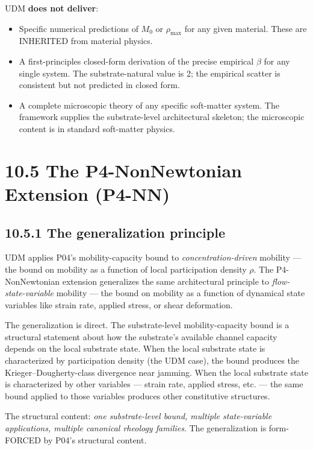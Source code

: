 \documentclass[11pt]{book}
\begin{document}
UDM \textbf{does not deliver}:
\begin{itemize}
\item Specific numerical predictions of $M_0$ or $\rho_\mathrm{max}$ for any given material. These are INHERITED from material physics.
\item A first-principles closed-form derivation of the precise empirical $\beta$ for any single system. The substrate-natural value is 2; the empirical scatter is consistent but not predicted in closed form.
\item A complete microscopic theory of any specific soft-matter system. The framework supplies the substrate-level architectural skeleton; the microscopic content is in standard soft-matter physics.
\end{itemize}

\section{10.5 The P4-NonNewtonian Extension (P4-NN)}

\subsection{10.5.1 The generalization principle}

UDM applies P04's mobility-capacity bound to \textit{concentration-driven} mobility — the bound on mobility as a function of local participation density $\rho$. The P4-NonNewtonian extension generalizes the same architectural principle to \textit{flow-state-variable} mobility — the bound on mobility as a function of dynamical state variables like strain rate, applied stress, or shear deformation.

The generalization is direct. The substrate-level mobility-capacity bound is a structural statement about how the substrate's available channel capacity depends on the local substrate state. When the local substrate state is characterized by participation density (the UDM case), the bound produces the Krieger–Dougherty-class divergence near jamming. When the local substrate state is characterized by other variables — strain rate, applied stress, etc. — the same bound applied to those variables produces other constitutive structures.

The structural content: \textit{one substrate-level bound, multiple state-variable applications, multiple canonical rheology families}. The generalization is form-FORCED by P04's structural content.
\end{document}
